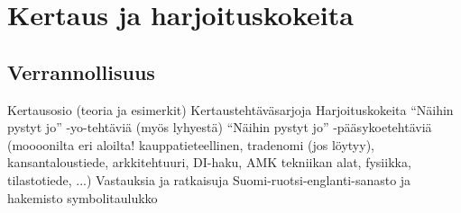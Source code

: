 %
\part{Kertaus ja harjoituskokeita}
\chapter{Verrannollisuus}

    Kertausosio (teoria ja esimerkit)
    Kertaustehtäväsarjoja
    Harjoituskokeita
    “Näihin pystyt jo” -yo-tehtäviä (myös lyhyestä)
    “Näihin pystyt jo” -pääsykoetehtäviä (moooonilta eri     aloilta! kauppatieteellinen, tradenomi (jos löytyy), kansantaloustiede, arkkitehtuuri, DI-haku, AMK tekniikan alat, fysiikka, tilastotiede, ...)
    Vastauksia ja ratkaisuja
    Suomi-ruotsi-englanti-sanasto ja hakemisto
    symbolitaulukko
